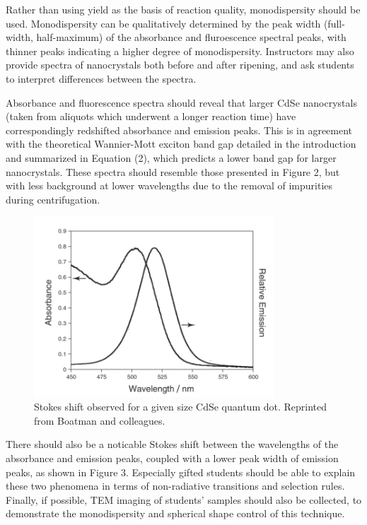 \documentclass[journal = jceda8, manuscript = article]{achemso}
\begin{document}
Rather than using yield as the basis of reaction quality, monodispersity should
be used. Monodispersity can be qualitatively determined by the peak width
(full-width, half-maximum) of the absorbance and fluroescence spectral peaks,
with thinner peaks indicating a higher degree of monodispersity. Instructors may
also provide spectra of nanocrystals both before and after ripening, and ask
students to interpret differences between the spectra.

Absorbance and fluorescence spectra should reveal that larger CdSe nanocrystals
(taken from aliquots which underwent a longer reaction time) have
correspondingly redshifted absorbance and emission peaks. This is in agreement
with the theoretical Wannier-Mott exciton band gap detailed in the introduction
and summarized in Equation (2), which predicts a lower band gap for larger
nanocrystals. These spectra should resemble those presented in Figure 2, but
with less background at lower wavelengths due to the removal of impurities
during centrifugation.

\begin{figure}[H]
	\includegraphics[width=0.8\textwidth]{./figures/stokes.png}
	\caption{Stokes shift observed for a given size CdSe quantum dot.
	Reprinted from Boatman and colleagues. \cite{jce-2}}
\end{figure}

There should also be a noticable Stokes shift between the wavelengths of the
absorbance and emission peaks, coupled with a lower peak width of emission
peaks, as shown in Figure 3. Especially gifted students should be able to
explain these two phenomena in terms of non-radiative transitions and selection
rules. Finally, if possible, TEM imaging of students' samples should also be
collected, to demonstrate the monodispersity and spherical shape control of this
technique.
\end{document}
